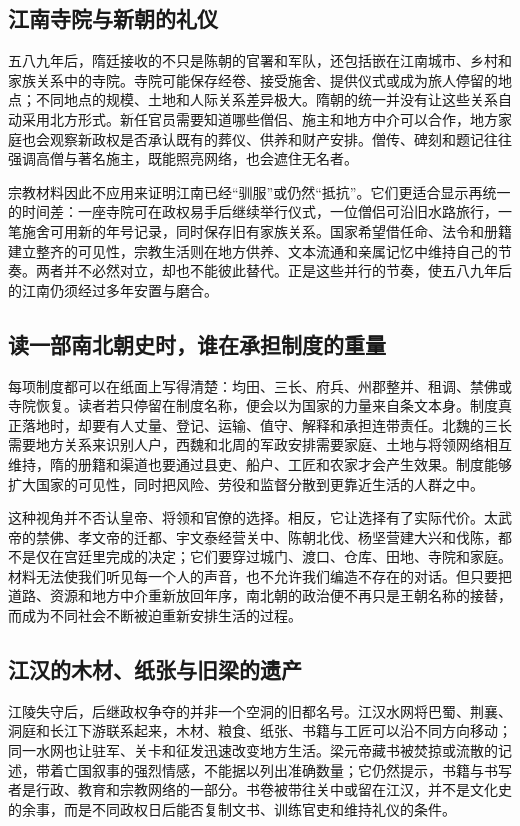 \subsection{江南寺院与新朝的礼仪}

五八九年后，隋廷接收的不只是陈朝的官署和军队，还包括嵌在江南城市、乡村和家族关系中的寺院。寺院可能保存经卷、接受施舍、提供仪式或成为旅人停留的地点；不同地点的规模、土地和人际关系差异极大。隋朝的统一并没有让这些关系自动采用北方形式。新任官员需要知道哪些僧侣、施主和地方中介可以合作，地方家庭也会观察新政权是否承认既有的葬仪、供养和财产安排。僧传、碑刻和题记往往强调高僧与著名施主，既能照亮网络，也会遮住无名者。

宗教材料因此不应用来证明江南已经“驯服”或仍然“抵抗”。它们更适合显示再统一的时间差：一座寺院可在政权易手后继续举行仪式，一位僧侣可沿旧水路旅行，一笔施舍可用新的年号记录，同时保存旧有家族关系。国家希望借任命、法令和册籍建立整齐的可见性，宗教生活则在地方供养、文本流通和亲属记忆中维持自己的节奏。两者并不必然对立，却也不能彼此替代。正是这些并行的节奏，使五八九年后的江南仍须经过多年安置与磨合。

\subsection{读一部南北朝史时，谁在承担制度的重量}

每项制度都可以在纸面上写得清楚：均田、三长、府兵、州郡整并、租调、禁佛或寺院恢复。读者若只停留在制度名称，便会以为国家的力量来自条文本身。制度真正落地时，却要有人丈量、登记、运输、值守、解释和承担连带责任。北魏的三长需要地方关系来识别人户，西魏和北周的军政安排需要家庭、土地与将领网络相互维持，隋的册籍和渠道也要通过县吏、船户、工匠和农家才会产生效果。制度能够扩大国家的可见性，同时把风险、劳役和监督分散到更靠近生活的人群之中。

这种视角并不否认皇帝、将领和官僚的选择。相反，它让选择有了实际代价。太武帝的禁佛、孝文帝的迁都、宇文泰经营关中、陈朝北伐、杨坚营建大兴和伐陈，都不是仅在宫廷里完成的决定；它们要穿过城门、渡口、仓库、田地、寺院和家庭。材料无法使我们听见每一个人的声音，也不允许我们编造不存在的对话。但只要把道路、资源和地方中介重新放回年序，南北朝的政治便不再只是王朝名称的接替，而成为不同社会不断被迫重新安排生活的过程。

\subsection{江汉的木材、纸张与旧梁的遗产}

江陵失守后，后继政权争夺的并非一个空洞的旧都名号。江汉水网将巴蜀、荆襄、洞庭和长江下游联系起来，木材、粮食、纸张、书籍与工匠可以沿不同方向移动；同一水网也让驻军、关卡和征发迅速改变地方生活。梁元帝藏书被焚掠或流散的记述，带着亡国叙事的强烈情感，不能据以列出准确数量；它仍然提示，书籍与书写者是行政、教育和宗教网络的一部分。书卷被带往关中或留在江汉，并不是文化史的余事，而是不同政权日后能否复制文书、训练官吏和维持礼仪的条件。

